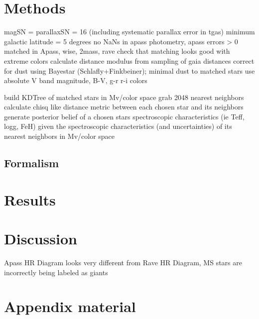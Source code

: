 \documentclass[iop]{emulateapj}
\begin{document}
\section{Methods}
magSN = parallaxSN = 16 (including systematic parallax error in tgas)
minimum galactic latitude = 5 degrees
no NaNs in apass photometry, apass errors > 0
matched in Apass, wise, 2mass, rave
check that matching looks good with extreme colors
calculate distance modulus from sampling of gaia distances
correct for dust using Bayestar (Schlafly+Finkbeiner); minimal dust to matched stars
use absolute V band magnitude, B-V, g-r r-i colors

build KDTree of matched stars in Mv/color space
grab 2048 nearest neighbors
calculate chisq like distance metric between each chosen star and its neighbors
generate posterior belief of a chosen stars spectroscopic characteristics (ie Teff, logg, FeH)
  given the spectroscopic characteristics (and uncertainties) of its nearest neighbors in Mv/color space


\subsection{Formalism} \label{bozomath}

\section{Results}

\section{Discussion}
Apass HR Diagram looks very different from Rave HR Diagram, MS stars are incorrectly being labeled as giants

\acknowledgments


\appendix

\section{Appendix material}


\begin{thebibliography}{}
\end{thebibliography}

\clearpage
\end{document}
